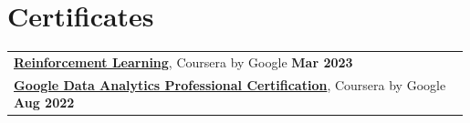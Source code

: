 \documentclass[letterpaper,10pt]{article}
\begin{document}
\section{Certificates}
\begin{tabular}{p{0.99\linewidth}}
    \hspace{0.15in}\textbf{\href{https://www.coursera.org/account/accomplishments/specialization/4SV8P8MB454L}{Reinforcement Learning}}, Coursera by Google
        \hfill \textbf{Mar 2023} \\
    \hspace{0.15in}\textbf{\href{https://www.coursera.org/account/accomplishments/professional-cert/BLNS9Y2N2MXE}{Google Data Analytics Professional Certification}}, Coursera by Google
        \hfill \textbf{Aug 2022} \\
\end{tabular}

\end{document}
